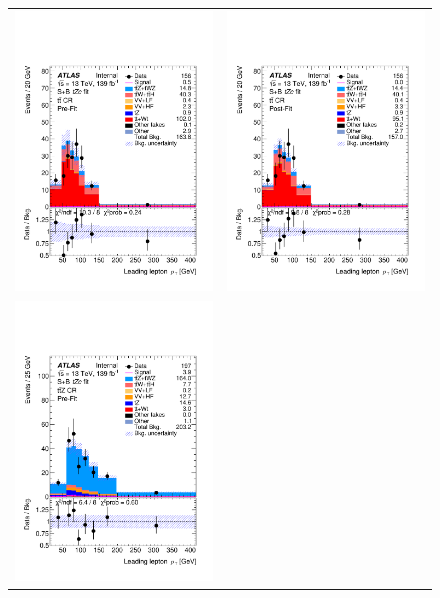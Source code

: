 \begin{figure}[htbp]
	\centering
	\begin{tabular}{cc}
		\includegraphics[width=.45\textwidth]{Appendices/AP8/figures/SPLUSB_CRSR_UsingSMTFullSys/Plots/TTCR} &
		\includegraphics[width=.45\textwidth]{Appendices/AP8/figures/SPLUSB_CRSR_UsingSMTFullSys/Plots/TTCR_postFit} \\
		\includegraphics[width=.45\textwidth]{Appendices/AP8/figures/SPLUSB_CRSR_UsingSMTFullSys/Plots/TTZCR} &

\end{tabular}
\end{figure}

